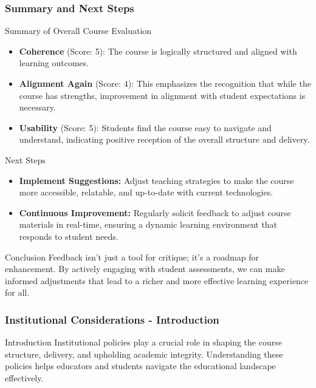 \documentclass[aspectratio=169]{beamer}
\begin{document}
\begin{frame}[fragile]
    \frametitle{Summary and Next Steps}
    \begin{block}{Summary of Overall Course Evaluation}
        \begin{itemize}
            \item \textbf{Coherence} (Score: 5): The course is logically structured and aligned with learning outcomes.
            \item \textbf{Alignment Again} (Score: 4): This emphasizes the recognition that while the course has strengths, improvement in alignment with student expectations is necessary.
            \item \textbf{Usability} (Score: 5): Students find the course easy to navigate and understand, indicating positive reception of the overall structure and delivery.
        \end{itemize}
    \end{block}
    
    \begin{block}{Next Steps}
        \begin{itemize}
            \item \textbf{Implement Suggestions:} Adjust teaching strategies to make the course more accessible, relatable, and up-to-date with current technologies.
            \item \textbf{Continuous Improvement:} Regularly solicit feedback to adjust course materials in real-time, ensuring a dynamic learning environment that responds to student needs.
        \end{itemize}
    \end{block}
    
    \begin{block}{Conclusion}
        Feedback isn't just a tool for critique; it's a roadmap for enhancement. By actively engaging with student assessments, we can make informed adjustments that lead to a richer and more effective learning experience for all.
    \end{block}
\end{frame}

\begin{frame}[fragile]
    \frametitle{Institutional Considerations - Introduction}
    \begin{block}{Introduction}
        Institutional policies play a crucial role in shaping the course structure, delivery, and upholding academic integrity. Understanding these policies helps educators and students navigate the educational landscape effectively.
    \end{block}
\end{frame}
\end{document}

